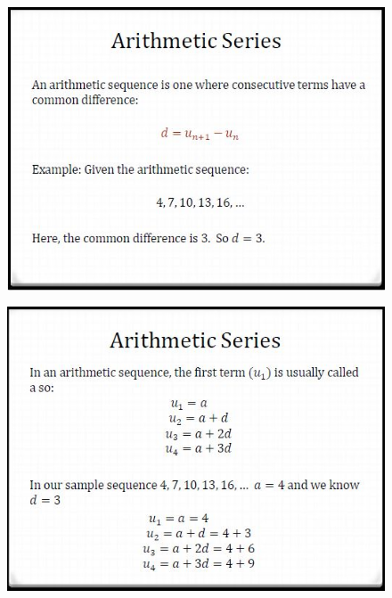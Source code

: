 \documentclass{beamer}
\begin{document}
\begin{frame}
\begin{figure}
\centering
\includegraphics[width=0.99\linewidth]{SeqSer16E}
\end{figure}
	
\end{frame}	
\begin{frame}
\begin{figure}
		\centering
		\includegraphics[width=0.99\linewidth]{SeqSer16f}
\end{figure}
	
\end{frame}
\end{document}
